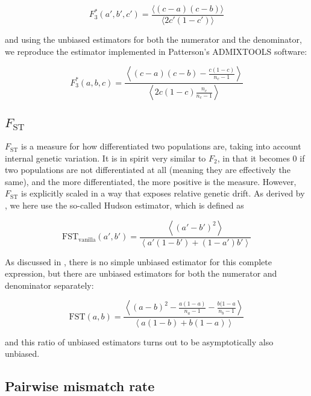 \documentclass{article}
\begin{document}
\begin{equation}
F_3^*(a',b',c')=\frac{\langle (c-a)(c-b)\rangle}{\langle 2 c'(1-c' )\rangle}
\end{equation}

and using the unbiased estimators for both the numerator and the denominator, we reproduce the estimator implemented in Patterson{'}s ADMIXTOOLS
software:

\begin{equation}
F_3^*(a,b,c)=\frac{\left\langle (c-a)(c-b)-\frac{c(1-c)}{n_c-1}\right\rangle}{\left\langle 2 c(1-c )\frac{n_c}{n_c-1}\right\rangle}
\end{equation}

\subsection{$F_\text{ST}$}

$F_\text{ST}$ is a measure for how differentiated two populations are, taking into account internal genetic variation. It is in spirit very similar to $F_2$, in that it becomes 0 if two populations are not differentiated at all (meaning they are effectively the same), and the more differentiated, the more positive is the measure. However, $F_\text{ST}$ is explicitly scaled in a way that exposes relative genetic drift. As derived by \cite{Bhatia2013-qj}, we here use the so-called Hudson estimator, which is defined as 

\begin{equation}
\text{FST}_\text{vanilla}(a',b')=\frac{\left\langle\left(a'-b'\right)^2\right\rangle}{\left\langle a' \left(1-b'\right)+\left(1-a'\right) b'\right\rangle}
\end{equation}

As discussed in \cite{Bhatia2013-qj}, there is no simple unbiased estimator for this complete expression, but there are unbiased estimators for both the numerator and denominator separately:

\begin{equation}
\text{FST}(a,b)=\frac{\left\langle\left(a-b\right)^2-\frac{a(1-a)}{n_a-1} - \frac{b(1-a}{n_b-1}\right\rangle}
{\left\langle a(1-b) + b(1-a)\right\rangle}
\end{equation}

and this ratio of unbiased estimators turns out to be asymptotically also unbiased.

\subsection{Pairwise mismatch rate}
\end{document}
